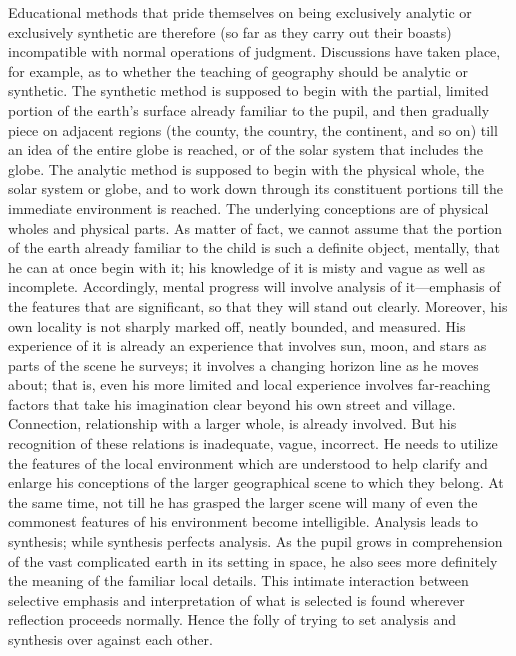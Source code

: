 \documentclass[letterpaper]{book}
\begin{document}
Educational methods that pride themselves on being exclusively analytic
or exclusively synthetic are therefore (so far as they carry out their
boasts) incompatible with normal operations of judgment. Discussions
have taken place, for example, as to whether the teaching of geography
should be analytic or synthetic. The synthetic method is supposed to
begin with the partial, limited portion of the earth's surface already
familiar to the pupil, and then gradually piece on adjacent regions (the
county, the country, the continent, and so on) till an idea of the
entire globe is reached, or of the solar system that includes the globe.
The analytic method is supposed to begin with the physical whole, the
solar system or globe, and to work down through its constituent portions
till the immediate environment is reached. The underlying conceptions
are of physical wholes and
physical
parts. As matter of fact, we cannot assume that the portion of the earth
already familiar to the child is such a definite object, mentally, that
he can at once begin with it; his knowledge of it is misty and vague as
well as incomplete. Accordingly, mental progress will involve analysis
of it---emphasis of the features that are significant, so that they will
stand out clearly. Moreover, his own locality is not sharply marked off,
neatly bounded, and measured. His experience of it is already an
experience that involves sun, moon, and stars as parts of the scene he
surveys; it involves a changing horizon line as he moves about; that is,
even his more limited and local experience involves far-reaching factors
that take his imagination clear beyond his own street and village.
Connection, relationship with a larger whole, is already involved. But
his recognition of these relations is inadequate, vague, incorrect. He
needs to utilize the features of the local environment which are
understood to help clarify and enlarge his conceptions of the larger
geographical scene to which they belong. At the same time, not till he
has grasped the larger scene will many of even the commonest features of
his environment become intelligible. Analysis leads to synthesis; while
synthesis perfects analysis. As the pupil grows in comprehension of the
vast complicated earth in its setting in space, he also sees more
definitely the meaning of the familiar local details. This intimate
interaction between selective emphasis and interpretation of what is
selected is found wherever reflection proceeds normally. Hence the folly
of trying to set analysis and synthesis over against each
other.
\end{document}
